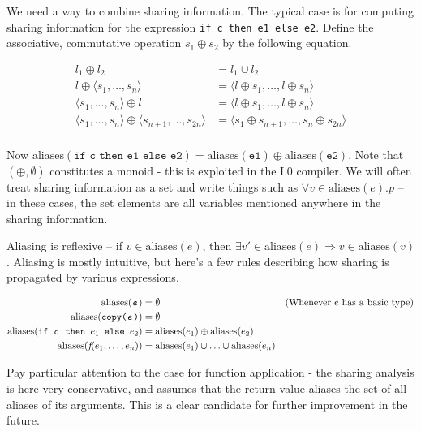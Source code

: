 \documentclass[oneside]{memoir}
\newcommand\aliases[1]{\textrm{aliases}(#1)}
\begin{document}
We need a way to combine sharing information.  The typical case is for
computing sharing information for the expression \texttt{if c then e1
  else e2}.  Define the associative, commutative operation $s_{1}
\oplus s_{2}$ by the following equation.

\begin{align*}
  l_{1} \oplus l_{2} &= l_{1} \cup l_{2} \\
  l \oplus \langle s_{1}, \ldots, s_{n} \rangle &= \langle l \oplus s_1, \ldots, l \oplus s_n \rangle \\
   \langle s_{1}, \ldots, s_{n} \rangle \oplus l &= \langle l \oplus s_1, \ldots, l \oplus s_n \rangle \\
  \langle s_{1}, \ldots, s_{n} \rangle \oplus \langle s_{n+1}, \ldots, s_{2n} \rangle &= \langle s_{1} \oplus s_{n+1}, \ldots, s_{n} \oplus s_{2n} \rangle \\
\end{align*}

Now $\aliases{\texttt{if c then e1 else e2}} = \aliases{\texttt{e1}}
\oplus \aliases{\texttt{e2}}$.  Note that $(\oplus, \emptyset)$
constitutes a monoid - this is exploited in the L0 compiler.  We will
often treat sharing information as a set and write things such as
$\forall v\in\aliases{e}.p$ -- in these cases, the set elements are
all variables mentioned anywhere in the sharing information.

Aliasing is reflexive -- if $v\in\aliases{e}$, then $\exists
v'\in\aliases{e}\Rightarrow v\in\aliases{v}$.  Aliasing is mostly
intuitive, but here's a few rules describing how sharing is
propagated by various expressions.

\begin{align*}
  \aliases{\texttt{\textit{e}}} &= \emptyset & (\text{Whenever $e$ has a basic type}) \\
  \aliases{\texttt{copy(\textit{e})}} &= \emptyset \\
  \aliases{\texttt{if \textit{c} then ${e}_{1}$ else ${e}_{2}$}} &= \aliases{e_{1}} \oplus \aliases{e_{2}} \\
  \aliases{\textit{f}(e_{1}, \ldots, e_{n})} &= \aliases{e_{1}} \cup \ldots \cup \aliases{e_{n}}
\end{align*}

Pay particular attention to the case for function application - the
sharing analysis is here very conservative, and assumes that the
return value aliases the set of all aliases of its arguments.  This is
a clear candidate for further improvement in the future.
\end{document}
